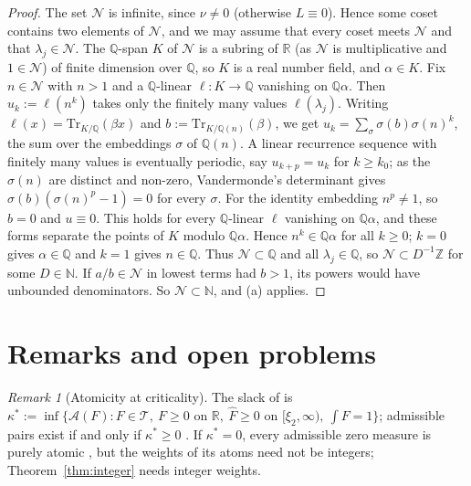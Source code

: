 \documentclass[11pt]{amsart}
\newcommand{\RR}{\mathbb R}
\newcommand{\ZZ}{\mathbb Z}
\newcommand{\NN}{\mathbb N}
\newcommand{\QQ}{\mathbb Q}
\newcommand{\hF}{\widehat F}
\newcommand{\xin}[1]{\xi_{#1}}
\newcommand{\Arch}{\mathcal A}
\newcommand{\Tc}{\mathcal T}
\theoremstyle{definition}
\theoremstyle{remark}
\newtheorem{remark}[theorem]{Remark}
\numberwithin{equation}{section}
\begin{document}
\begin{proof}
The set $\mathcal N$ is infinite, since $\nu\ne0$ (otherwise $L\equiv0$). Hence some coset contains two elements of $\mathcal N$, and we
may assume that every coset meets $\mathcal N$ and that $\lambda_j\in\mathcal N$. The $\QQ$-span $K$ of $\mathcal N$ is a subring of $\RR$
(as $\mathcal N$ is multiplicative and $1\in\mathcal N$) of finite dimension over $\QQ$, so $K$ is a real number field, and $\alpha\in K$.
Fix $n\in\mathcal N$ with $n>1$ and a $\QQ$-linear $\ell:K\to\QQ$ vanishing on $\QQ\alpha$. Then $u_k:=\ell(n^k)$ takes only the finitely
many values $\ell(\lambda_j)$. Writing $\ell(x)=\mathrm{Tr}_{K/\QQ}(\beta x)$ and $b:=\mathrm{Tr}_{K/\QQ(n)}(\beta)$, we get
$u_k=\sum_\sigma\sigma(b)\sigma(n)^k$, the sum over the embeddings $\sigma$ of $\QQ(n)$. A linear recurrence sequence with finitely many
values is eventually periodic, say $u_{k+p}=u_k$ for $k\ge k_0$; as the $\sigma(n)$ are distinct and non-zero, Vandermonde's
determinant gives $\sigma(b)(\sigma(n)^p-1)=0$ for every $\sigma$. For the identity embedding $n^p\ne1$, so $b=0$ and $u\equiv0$. This holds
for every $\QQ$-linear $\ell$ vanishing on $\QQ\alpha$, and these forms separate the points of $K$ modulo $\QQ\alpha$. Hence
$n^k\in\QQ\alpha$ for all $k\ge0$; $k=0$ gives $\alpha\in\QQ$ and $k=1$ gives $n\in\QQ$. Thus $\mathcal N\subset\QQ$ and all $\lambda_j\in\QQ$,
so $\mathcal N\subset D^{-1}\ZZ$ for some $D\in\NN$. If $a/b\in\mathcal N$ in lowest terms had $b>1$, its powers would have unbounded
denominators. So $\mathcal N\subset\NN$, and (a) applies.
\end{proof}

\section{Remarks and open problems}\label{sec:open}

\begin{remark}[Atomicity at criticality]
The slack of \cite{PaperI} is $\kappa^*:=\inf\{\Arch(F):F\in\Tc,\ F\ge0\text{ on }\RR,\ \hF\ge0\text{ on }[\xin2,\infty),\ \int F=1\}$;
admissible pairs exist if and only if $\kappa^*\ge0$ \cite[Theorem~A]{PaperI}. If $\kappa^*=0$, every admissible zero measure is purely atomic
\cite{PaperI}, but the weights of its atoms need not be integers; Theorem~\ref{thm:integer} needs integer weights.
\end{remark}
\end{document}
